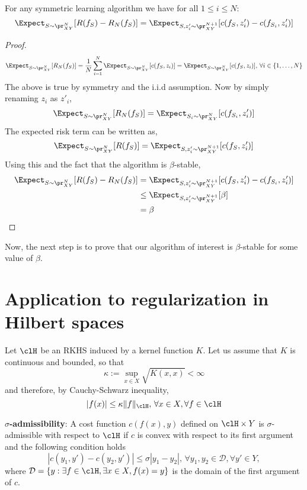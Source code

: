 \begin{lemma}
	For any symmetric learning algorithm we have for all $1\leq i \leq N$:
	\[
	\Expect_{S \sim \pr^N_{XY}} [R(f_S) - R_N(f_S)] = \Expect_{S,z'_i \sim \pr^{N+1}_{XY}} [c(f_S,z'_i) - c(f_{S_i}, z'_i)]
	\]
	\begin{proof}
		\[
		\Expect_{S \sim \pr^N_{XY}} [R_N(f_S)] = \frac{1}{N} \sum_{i=1}^N \Expect_{S \sim \pr^N_{XY}} [c(f_S, z_i)] = \Expect_{S \sim \pr^N_{XY}} [c(f_S, z_i)], \, \forall i \in \{1,\dots, N\}
		\]
		The above is true by symmetry and the i.i.d assumption. Now by simply renaming $z_i$ as $z'_i$,
		\[
		\Expect_{S \sim \pr^N_{XY}}[R_N(f_S)] = \Expect_{S_i \sim \pr^N_{XY}}[c(f_{S_i}, z'_i)]
		\]
		The expected risk term can be written as, 
		\[
		\Expect_{S \sim \pr^N_{XY}}[R(f_S)] = \Expect_{S,z'_i \sim \pr^{N+1}_{XY}} [c(f_S, z'_i)]
		\]
		Using this and the fact that the algorithm is $\beta$-stable, 
		\[
		\begin{aligned}
		\Expect_{S \sim \pr^N_{XY}} [R(f_S) - R_N(f_S)] &= \Expect_{S,z'_i\sim \pr^{N+1}_{XY}}[c(f_S,z'_i) - c(f_{S_i},z'_i)]\\
		&\leq \Expect_{S,z'_i\sim \pr^{N+1}_{XY}}[\beta] \\
		& = \beta
		\end{aligned}
		\]
	\end{proof}
\end{lemma}
Now, the next step is to prove that our algorithm of interest is $\beta$-stable for some value of $\beta$. 

\section{Application to regularization in Hilbert spaces}
Let $\clH$ be an RKHS induced by a kernel function $K$. Let us assume that $K$ is continuous and bounded, so that
\[
\kappa := \sup_{x \in X} \sqrt{K(x,x)} < \infty
\]
and therefore, by Cauchy-Schwarz inequality,
\begin{equation}
|f(x)| \leq \kappa \|f\|_\clH, \, \forall x \in X, \forall f \in \clH 
\label{e:cauchy_schwarz}
\end{equation}

\noindent \textbf{$\sigma$-admissibility}: A cost function $c(f(x),y)$ defined on $\clH \times Y$ is $\sigma$-admissible with respect to $\clH$ if $c$ is convex with respect to its first argument and the following condition holds
\[
|c(y_1, y') - c(y_2, y')| \leq \sigma |y_1 - y_2|, \, \forall y_1,y_2 \in \mathcal{D}, \forall y' \in Y,
\]
where $\mathcal{D} = \{y: \exists f \in \clH, \exists x \in X, f(x) = y\}$ is the domain of the first argument of $c$.  

